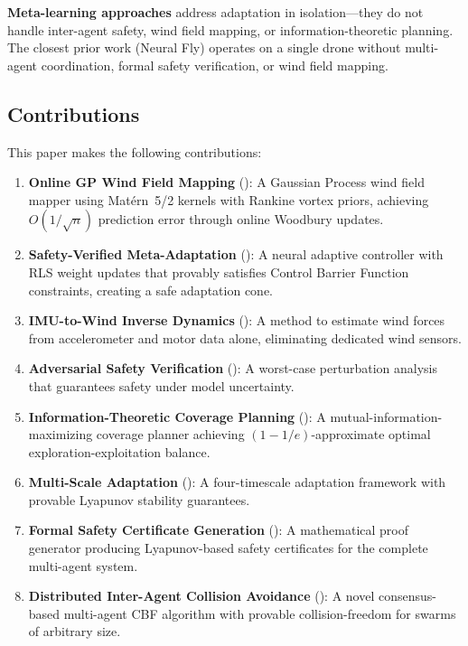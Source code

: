 \documentclass[12pt,a4paper,twocolumn]{article}
\begin{document}
\textbf{Meta-learning approaches} \citep{NeuralFly2022} address adaptation in isolation---they do not handle inter-agent safety, wind field mapping, or information-theoretic planning. The closest prior work (Neural Fly) operates on a single drone without multi-agent coordination, formal safety verification, or wind field mapping.

\subsection{Contributions}
\label{sec:contributions}

This paper makes the following contributions:

\begin{enumerate}[leftmargin=*, label=\textbf{C\arabic*}]
    \item \textbf{Online GP Wind Field Mapping} (): A Gaussian Process wind field mapper using Mat\'ern~5/2 kernels with Rankine vortex priors, achieving $O(1/\sqrt{n})$ prediction error through online Woodbury updates.
    \item \textbf{Safety-Verified Meta-Adaptation} (): A neural adaptive controller with RLS weight updates that provably satisfies Control Barrier Function constraints, creating a safe adaptation cone.
    \item \textbf{IMU-to-Wind Inverse Dynamics} (): A method to estimate wind forces from accelerometer and motor data alone, eliminating dedicated wind sensors.
    \item \textbf{Adversarial Safety Verification} (): A worst-case perturbation analysis that guarantees safety under model uncertainty.
    \item \textbf{Information-Theoretic Coverage Planning} (): A mutual-information-maximizing coverage planner achieving $(1-1/e)$-approximate optimal exploration-exploitation balance.
    \item \textbf{Multi-Scale Adaptation} (): A four-timescale adaptation framework with provable Lyapunov stability guarantees.
    \item \textbf{Formal Safety Certificate Generation} (): A mathematical proof generator producing Lyapunov-based safety certificates for the complete multi-agent system.
    \item \textbf{Distributed Inter-Agent Collision Avoidance} (): A novel consensus-based multi-agent CBF algorithm with provable collision-freedom for swarms of arbitrary size.
\end{enumerate}
\end{document}
